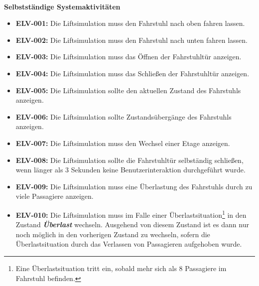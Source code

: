 \paragraph{}
\textbf{Selbstständige Systemaktivitäten}
\begin{itemize}
	\item \textbf{ELV-001:} \newline
		Die Liftsimulation muss den Fahrstuhl nach oben fahren lassen.
	\item \textbf{ELV-002:} \newline
		Die Liftsimulation muss den Fahrstuhl nach unten fahren lassen.
	\item \textbf{ELV-003:} \newline
		Die Liftsimulation muss das Öffnen der Fahrstuhltür anzeigen.
	\item \textbf{ELV-004:} \newline
		Die Liftsimulation muss das Schließen der Fahrstuhltür anzeigen.
	\item \textbf{ELV-005:} \newline
		Die Liftsimulation sollte den aktuellen Zustand des Fahrstuhls anzeigen.
	\item \textbf{ELV-006:} \newline
		Die Liftsimulation sollte Zustandsübergänge des Fahrstuhls anzeigen.
	\item \textbf{ELV-007:} \newline
		Die Liftsimulation muss den Wechsel einer Etage anzeigen.
	\item \textbf{ELV-008:} \newline
		Die Liftsimulation sollte die Fahrstuhltür selbständig schließen, wenn 
		länger als 3 Sekunden keine Benutzerinteraktion durchgeführt wurde.
	\item \textbf{ELV-009:} \newline
		Die Liftsimulation muss eine Überlastung des Fahrstuhls durch zu 
		viele Passagiere anzeigen.
		\newline
		
	\item \textbf{ELV-010:} \newline
		Die Liftsimulation muss im Falle einer Überlastsituation\footnote{Eine Überlastsituation tritt ein, sobald mehr sich als 8 Passagiere im Fahrstuhl befinden.} in den Zustand \textit{\textbf{Überlast}} wechseln. Ausgehend von diesem Zustand  ist es dann nur noch möglich in den vorherigen Zustand zu wechseln, sofern die Überlastsituation durch das Verlassen von Passagieren aufgehoben wurde.
\end{itemize}

